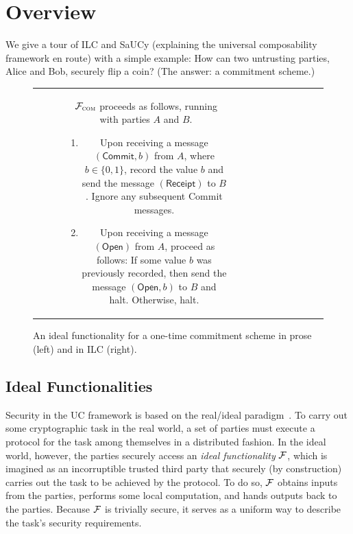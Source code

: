 \section{Overview}
\label{sec:overview}

We give a tour of ILC and SaUCy (explaining the universal composability
framework en route) with a simple example: How can two untrusting parties, Alice
and Bob, securely flip a coin? (The answer: a commitment scheme.)

\begin{figure}[t]
\centering
\begin{tabular}{c|c}
\begin{subfigure}{.575\textwidth}
    $\mathcal{{F}}_{\textsc{com}}$ proceeds as follows, running with parties $A$ and
  $B$.
    \begin{enumerate}
        \item Upon receiving a message $(\mathsf{Commit}, b)$ from $A$, where $b
          \in \{ 0, 1 \}$, record the value $b$ and send the message
          $(\mathsf{Receipt})$ to $B$. Ignore any subsequent \textsf{Commit}
          messages.
        \item Upon receiving a message $(\mathsf{Open})$ from $A$, proceed as
          follows: If some value $b$ was previously recorded, then send the
          message $(\mathsf{Open}, b)$ to $B$ and halt. Otherwise, halt.
    \end{enumerate}
\label{func:com}
\end{subfigure}\hspace{0.02\textwidth}
&\hspace{0.02\textwidth}
\begin{subfigure}{.35\textwidth}
  
\end{subfigure}
\end{tabular}
\caption{An ideal functionality for a one-time commitment scheme in prose (left)
  and in ILC (right).}
\label{func:com}
\end{figure}

\subsection{Ideal Functionalities}
\label{subsec:functionalities}

Security in the UC framework is based on the real/ideal
paradigm~\cite{goldreich1987play}. To carry out some cryptographic task in the
real world, a set of parties must execute a protocol for the task among
themselves in a distributed fashion. In the ideal world, however, the parties
securely access an \emph{ideal functionality} $\mathcal{{F}}$, which is imagined as an
incorruptible trusted third party that securely (by construction) carries out
the task to be achieved by the protocol. To do so, $\mathcal{{F}}$ obtains inputs from
the parties, performs some local computation, and hands outputs back to the
parties. Because $\mathcal{{F}}$ is trivially secure, it serves as a uniform way to
describe the task's security requirements.\smallskip

